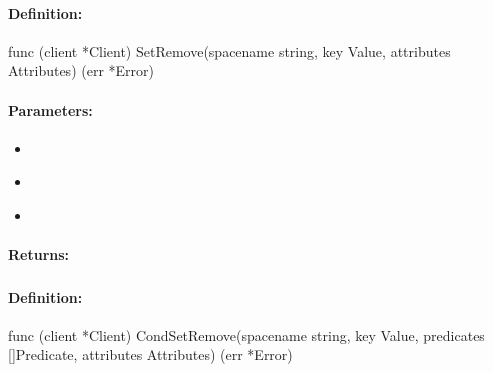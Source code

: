 \paragraph{Definition:}
\begin{gocode}
func (client *Client) SetRemove(spacename string, key Value, attributes Attributes) (err *Error)
\end{gocode}

\paragraph{Parameters:}
\begin{itemize}[noitemsep]
\item {}\\

\item {}\\

\item {}\\

\end{itemize}

\paragraph{Returns:}


\pagebreak
\subsubsection{}
\label{api:Go:CondSetRemove}


\paragraph{Definition:}
\begin{gocode}
func (client *Client) CondSetRemove(spacename string, key Value, predicates []Predicate, attributes Attributes) (err *Error)
\end{gocode}


